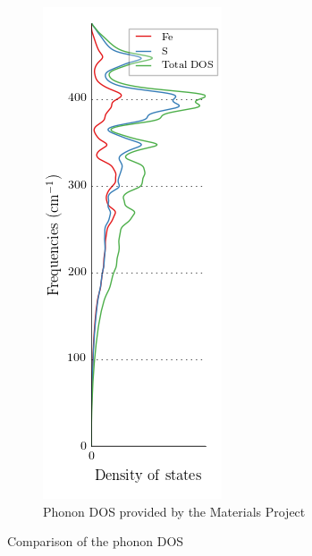 \documentclass[11pt,a4paper]{article}
\begin{document}
\begin{figure}
\hfill
\begin{subfigure}[b]{0.36\textwidth}
\centering
\includegraphics[width=\textwidth]{images/phonon_dos.png}
\caption{Phonon DOS provided by the Materials Project}
\label{fig:phonondos2}
\end{subfigure}
\caption{Comparison of the phonon DOS}
\label{fig:phonondos}
\end{figure}
\newpage
\end{document}
